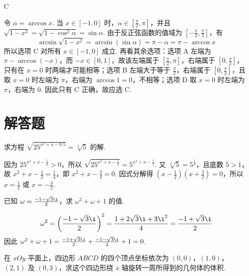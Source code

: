 \documentclass[UTF8,a4paper,oneside,11pt]{ctexbook}
\begin{document}
\begin{answer}
C
\end{answer}

\begin{solution}
令 \(\alpha=\arccos x\). 当 \(x\in[-1,0]\) 时，\(\alpha\in[\frac{\pi}{2},\pi]\)，并且 \(\sqrt{1-x^2}=\sqrt{1-\cos^2\alpha}=\sin\alpha\). 由于反正弦函数的值域为 \([-\frac{\pi}{2},\frac{\pi}{2}]\)，有
\[
\arcsin\sqrt{1-x^2}=\arcsin(\sin\alpha)=\pi-\alpha=\pi-\arccos x
\]
所以选项 C 对所有 \(x\in[-1,0]\) 成立. 再看其余选项：选项 A 左端为 \(\pi-\arccos(-x)\)，而 \(-x\in[0,1]\)，故该左端属于 \([\frac{\pi}{2},\pi]\)，右端属于 \([0,\frac{\pi}{2}]\)，只有在 \(x=0\) 时两端才可能相等；选项 B 左端大于等于 \(\frac{\pi}{2}\)，右端属于 \([0,\frac{\pi}{2}]\)，且取 \(x=0\) 时左端为 \(\pi\)，右端为 \(\arccos 1=0\)，不相等；选项 D 取 \(x=0\) 时左端为 \(\pi\)，右端为 \(0\). 因此只有 C 正确，故应选 C.
\end{solution}

\section{解答题}

\begin{problem}

求方程 \(\sqrt{25^{x^2 + x - 0.5}} = \sqrt[4]{5}\) 的解.
\end{problem}

\begin{solution}
因为 \(25^{x^2+x-\frac{1}{2}}>0\)，所以
\(\sqrt{25^{x^2+x-\frac{1}{2}}}=5^{x^2+x-\frac{1}{2}}\).
又 \(\sqrt[4]{5}=5^{\frac{1}{4}}\)，且底数 \(5>1\)，故
\(x^2+x-\frac{1}{2}=\frac{1}{4}\)，即 \(x^2+x-\frac{3}{4}=0\). 因式分解得 \(\left(x-\frac{1}{2}\right)\left(x+\frac{3}{2}\right)=0\)，所以 \(x=\frac{1}{2}\) 或 \(x=-\frac{3}{2}\).
\end{solution}

\begin{problem}

已知 \(\omega = \frac{-1 - \sqrt{3}\i}{2}\)，求 \(\omega^2 + \omega + 1\) 的值.
\end{problem}

\begin{solution}
\[
\omega^2=\left(\frac{-1-\sqrt{3}\i}{2}\right)^2
=\frac{1+2\sqrt{3}\i+3\i^2}{4}
=\frac{-1+\sqrt{3}\i}{2}
\]
因此 \(\omega^2+\omega+1=\frac{-1+\sqrt{3}\i}{2}+\frac{-1-\sqrt{3}\i}{2}+1=0\).
\end{solution}

\begin{problem}

在 \(xOy\) 平面上，四边形 \(ABCD\) 的四个顶点坐标依次为 \((0,0)\)，\((1,0)\)，\((2,1)\) 及 \((0,3)\)，求这个四边形绕 \(x\) 轴旋转一周所得到的几何体的体积.
\end{problem}
\end{document}
